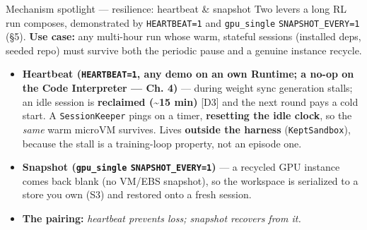 \documentclass[
  10pt,
  ignorenonframetext,
  aspectratio=169,
  t]{beamer}
\providecommand{\tightlist}{%
  \setlength{\itemsep}{0pt}\setlength{\parskip}{0pt}}
\begin{document}
\begin{frame}{Mechanism spotlight --- resilience: heartbeat \&
snapshot}
\protect\hypertarget{mechanism-spotlight-resilience-heartbeat-snapshot}{}
Two levers a long RL run composes, demonstrated by \texttt{HEARTBEAT=1}
and \texttt{gpu\_single} \texttt{SNAPSHOT\_EVERY=1} (§5). \textbf{Use
case:} any multi-hour run whose warm, stateful sessions (installed deps,
seeded repo) must survive both the periodic pause and a genuine instance
recycle.

\begin{itemize}
\tightlist
\item
  \textbf{Heartbeat (\texttt{HEARTBEAT=1}, any demo on an own Runtime; a
  no-op on the Code Interpreter --- Ch. 4)} --- during weight sync
  generation stalls; an idle session is \textbf{reclaimed
  (\textasciitilde15 min)} {[}D3{]} and the next round pays a cold
  start. A \texttt{SessionKeeper} pings on a timer, \textbf{resetting
  the idle clock}, so the \emph{same} warm microVM survives. Lives
  \textbf{outside the harness} (\texttt{KeptSandbox}), because the stall
  is a training-loop property, not an episode one.
\item
  \textbf{Snapshot (\texttt{gpu\_single} \texttt{SNAPSHOT\_EVERY=1})}
  --- a recycled GPU instance comes back blank (no VM/EBS snapshot), so
  the workspace is serialized to a store you own (S3) and restored onto
  a fresh session.
\item
  \textbf{The pairing:} \emph{heartbeat prevents loss; snapshot recovers
  from it.}
\end{itemize}
\end{frame}
\end{document}
